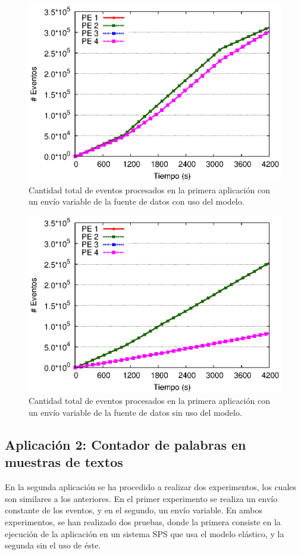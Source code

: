 \begin{figure}[!ht]
\centering
    \includegraphics[scale=0.7]{images/exp/app1/normal/cm/eventCount.eps}
    \caption{Cantidad total de eventos procesados en la primera aplicación con un envío variable de la fuente de datos con uso del modelo.}
    \label{fig:app1-normal-eventCount-cm}
\end{figure}

\begin{figure}[!ht]
\centering
    \includegraphics[scale=0.7]{images/exp/app1/normal/sm/eventCount.eps}
    \caption{Cantidad total de eventos procesados en la primera aplicación con un envío variable de la fuente de datos sin uso del modelo.}
    \label{fig:app1-normal-eventCount-sm}
\end{figure}

\subsection{Aplicación 2: Contador de palabras en muestras de textos}
En la segunda aplicación se ha procedido a realizar dos experimentos, los cuales son similares a los anteriores. En el primer experimento se realiza un envío constante de los eventos, y en el segundo, un envío variable. En ambos experimentos, se han realizado dos pruebas, donde la primera consiste en la ejecución de la aplicación en un sistema SPS que usa el modelo elástico, y la segunda sin el uso de éste.

